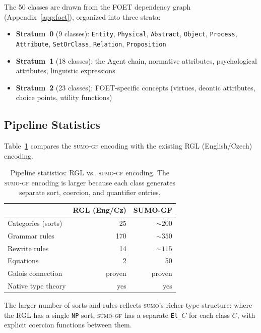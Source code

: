 \documentclass[11pt]{article}
\newcommand{\SUMO}{\textsc{sumo}}
\newcommand{\GF}{\textsc{gf}}
\theoremstyle{definition}
\theoremstyle{plain}
\begin{document}
The 50 classes are drawn from the FOET dependency graph
(Appendix~\ref{app:foet}), organized into three strata:
\begin{itemize}[nosep]
  \item \textbf{Stratum~0} (9 classes): \texttt{Entity}, \texttt{Physical},
    \texttt{Abstract}, \texttt{Object}, \texttt{Process},
    \texttt{Attribute}, \texttt{SetOrClass}, \texttt{Relation},
    \texttt{Proposition}
  \item \textbf{Stratum~1} (18 classes): the Agent chain, normative
    attributes, psychological attributes, linguistic expressions
  \item \textbf{Stratum~2} (23 classes): FOET-specific concepts
    (virtues, deontic attributes, choice points, utility functions)
\end{itemize}

\subsection{Pipeline Statistics}

Table~\ref{tab:sumo-gf-stats} compares the \SUMO{}-\GF{} encoding
with the existing RGL (English/Czech) encoding.

\begin{table}[h]
\centering
\begin{tabular}{lrr}
\toprule
& \textbf{RGL (Eng/Cz)} & \textbf{SUMO-GF} \\
\midrule
Categories (sorts) & 25 & ${\sim}200$ \\
Grammar rules & 170 & ${\sim}350$ \\
Rewrite rules & 14 & ${\sim}115$ \\
Equations & 2 & 50 \\
\midrule
Galois connection & proven & proven \\
Native type theory & yes & yes \\
\bottomrule
\end{tabular}
\caption{Pipeline statistics: RGL vs.\ \SUMO{}-\GF{} encoding.
  The \SUMO{}-\GF{} encoding is larger because each class generates
  separate sort, coercion, and quantifier entries.}
\label{tab:sumo-gf-stats}
\end{table}

The larger number of sorts and rules reflects \SUMO{}'s richer type
structure: where the RGL has a single \texttt{NP} sort, \SUMO{}-\GF{}
has a separate \texttt{El\_$C$} for each class $C$, with explicit
coercion functions between them.
\end{document}
